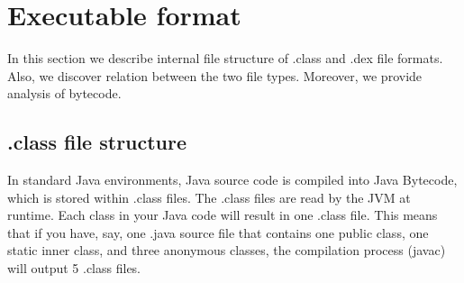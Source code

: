\documentclass[11pt, oneside]{article}   	%
\begin{document}

\section{Executable format}

In this section we describe internal file structure of .class and .dex file formats. Also, we discover relation between the two file types. Moreover, we provide analysis of bytecode. 

\subsection{.class file structure}

In standard Java environments, Java source code is compiled into Java Bytecode, which is stored within .class files. The .class files are read by the JVM at runtime. Each class in your Java code will result in one .class file. This means that if you have, say, one .java source file that contains one public class, one static inner class, and three anonymous classes, the compilation process (javac) will output 5 .class files.
\end{document}
